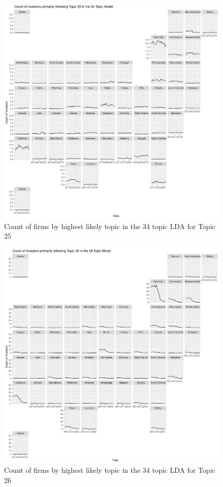 \begin{figure}
	\centering
	\includegraphics[width=1\linewidth]{Figures/ChapterV/USA_34_Topic25.pdf}
	\caption[Count of Firms for Topic 25 by Quarter]{Count of firms by highest likely topic in the 34 topic LDA for Topic 25}
	\label{fig:StateLDA25}
\end{figure}

\begin{figure}
	\centering
	\includegraphics[width=1\linewidth]{Figures/ChapterV/USA_34_Topic26.pdf}
	\caption[Count of Firms for Topic 26 by Quarter]{Count of firms by highest likely topic in the 34 topic LDA for Topic 26}
	\label{fig:StateLDA26}
\end{figure}

